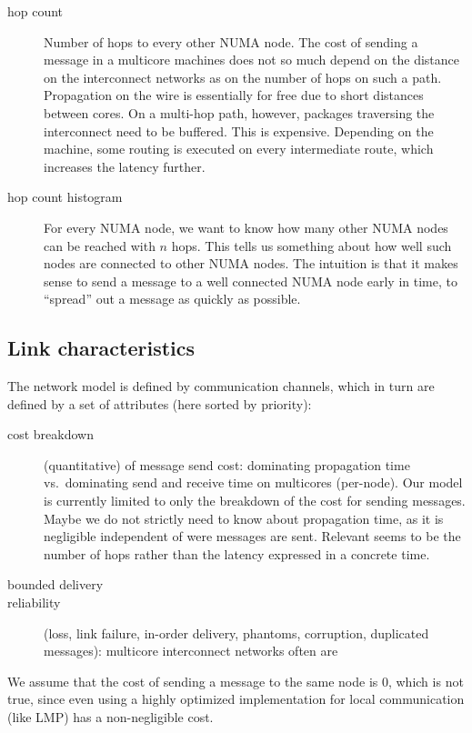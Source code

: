 \documentclass{article}
\begin{document}
\begin{description}
\item[hop count] Number of hops to every other NUMA node. The cost of
  sending a message in a multicore machines does not so much depend on
  the distance on the interconnect networks as on the number of hops
  on such a path. Propagation on the wire is essentially for free due
  to short distances between cores. %
  On a multi-hop path, however, packages traversing the interconnect
  need to be buffered. This is expensive. Depending on the machine,
  some routing is executed on every intermediate route, which
  increases the latency further.
\item[hop count histogram] For every NUMA node, we want to know how
  many other NUMA nodes can be reached with $n$ hops. This tells us
  something about how well such nodes are connected to other NUMA
  nodes. The intuition is that it makes sense to send a message to a
  well connected NUMA node early in time, to ``spread'' out a message
  as quickly as possible.
\end{description}

\subsection{Link characteristics} 
\label{sec:model_links}

The network model is defined by communication channels, which in turn
are defined by a set of attributes (here sorted by priority):

\begin{description}
\item[cost breakdown] (quantitative) of message send cost:
  dominating propagation time vs.\ dominating send and receive time on
  multicores (per-node). Our model is currently limited to only the
  breakdown of the cost for sending messages. Maybe we do not strictly
  need to know about propagation time, as it is negligible independent
  of were messages are sent. Relevant seems to be the number of hops
  rather than the latency expressed in a concrete time.
\item[bounded delivery]
\item[reliability] (loss, link failure, in-order delivery, phantoms,
  corruption, duplicated messages): 
  multicore interconnect networks often are
\end{description}

We assume that the cost of sending a message to the same node is 0,
which is not true, since even using a highly optimized implementation
for local communication (like LMP) has a non-negligible cost.
\end{document}
